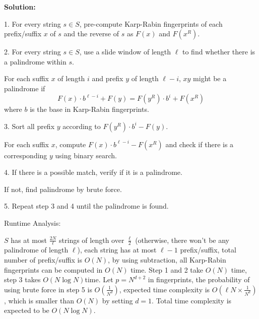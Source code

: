 \documentclass[11pt]{article}
\begin{document}
\begin{description}

\textbf{Solution:}

1. For every string $s\in S$, pre-compute Karp-Rabin fingerprints of each prefix/suffix 
$x$ of $s$ and the reverse of $s$ as $F(x)$ and $F(x^R)$.

2. For every string $s\in S$, use a slide window of length $\ell$ to find whether
there is a palindrome within $s$.

For each suffix $x$ of length $i$ and prefix $y$ of length $\ell-i$, $xy$ might be a palindrome if
\[F(x)\cdot b^{\ell-i} + F(y) = F(y^R)\cdot b^i + F(x^R)\]
where $b$ is the base in Karp-Rabin fingerprints.

3. Sort all prefix $y$ according to $F(y^R)\cdot b^i - F(y)$. 

For each suffix $x$,
compute $F(x)\cdot b^{\ell-i} - F(x^R)$ and check if there is a corresponding $y$ using binary search.

4. If there is a possible match, verify if it is a palindrome. 

If not, find palindrome by brute force.

5. Repeat step 3 and 4 until the palindrome is found.

Runtime Analysis:

$S$ has at most $\frac{2N}{\ell}$ strings of length over $\frac{\ell}{2}$
(otherwise, there won't be any palindrome of length $\ell$), 
each string has at most $\ell-1$ prefix/suffix, total number of prefix/suffix is $O(N)$, 
by using subtraction, all Karp-Rabin fingerprints can be computed in $O(N)$ time. 
Step 1 and 2 take $O(N)$ time, step 3 takes $O(N\log N)$time.
Let $p=N^{d+2}$ in fingerprints, the probability of using brute force in step 5 is
$O(\frac{1}{N^d})$, expected time complexity is $O(\ell N \times \frac{1}{N^d})$,
which is smaller than $O(N)$ by setting $d=1$.
Total time complexity is expected to be $O(N\log N)$.

\end{description}
\end{document}
